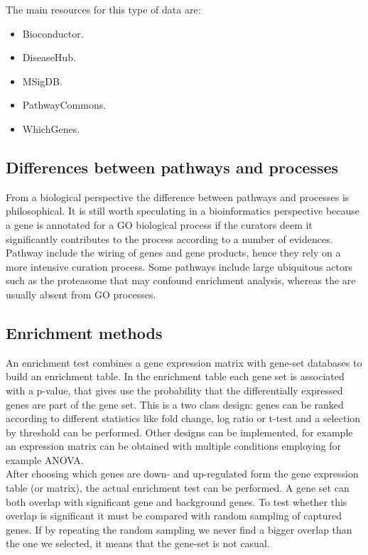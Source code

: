 		The main resources for this type of data are:
	
			\begin{itemize}
				\item Bioconductor.
				\item DiseaseHub.
				\item MSigDB.
				\item PathwayCommons.
				\item WhichGenes.
			\end{itemize}
		

	\subsection{Differences between pathways and processes}
	From a biological perspective the difference between pathways and processes is philosophical.
	It is still worth speculating in a bioinformatics perspective because a gene is annotated for a GO biological process if the curators deem it significantly contributes to the process according to a number of evidences.
	Pathway include the wiring of genes and gene products, hence they rely on a more intensive curation process.
	Some pathways include large ubiquitous actors such as the proteasome that may confound enrichment analysis, whereas the are usually absent from GO processes.
	
	
	\subsection{Enrichment methods}
	An enrichment test combines a gene expression matrix with gene-set databases to build an enrichment table.
	In the enrichment table each gene set is associated with a p-value, that gives use the probability that the differentially expressed genes are part of the gene set.
	This is a two class design: genes can be ranked according to different statistics like fold change, log ratio or t-test and a selection by threshold can be performed.
	Other designs can be implemented, for example an expression matrix can be obtained with multiple conditions employing for example ANOVA.
	\\
	After choosing which genes are down- and up-regulated form the gene expression table (or matrix), the actual enrichment test can be performed. 
	A gene set can both overlap with significant gene and background genes.
	To test whether this overlap is significant it must be compared with random sampling of captured genes.
	If by repeating the random sampling we never find a bigger overlap than the one we selected, it means that the gene-set is not casual.

